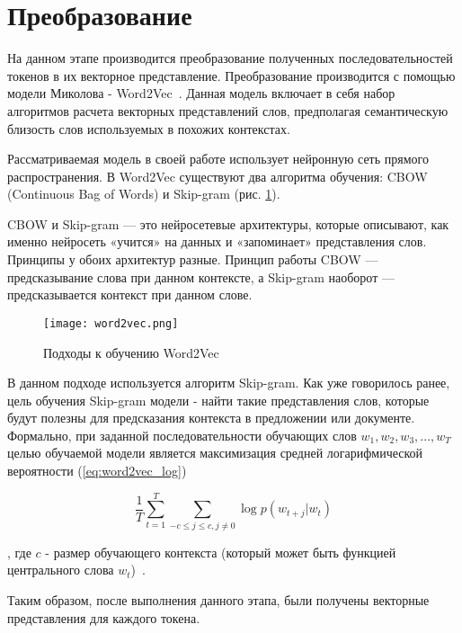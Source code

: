 \section{Преобразование}

На данном этапе производится преобразование полученных последовательностей токенов в их векторное представление. Преобразование производится с помощью модели Миколова - Word2Vec~\cite{word2vec}. Данная модель включает в себя набор алгоритмов расчета векторных представлений слов, предполагая семантическую близость слов используемых в похожих контекстах.

Рассматриваемая модель в своей работе использует нейронную сеть прямого распространения. В Word2Vec существуют два алгоритма обучения: CBOW (Continuous Bag of Words) и Skip-gram (рис. \ref{fig:word2vec}).


CBOW и Skip-gram — это нейросетевые архитектуры, которые описывают, как именно нейросеть «учится» на данных и «запоминает» представления слов. Принципы у обоих архитектур разные. Принцип работы CBOW — предсказывание слова при данном контексте, а Skip-gram наоборот — предсказывается контекст при данном слове.

\begin{figure}[htbp]
\centering
\texttt{[image: word2vec.png]}
\caption{Подходы к обучению Word2Vec}
\label{fig:word2vec}
\end{figure}

В данном подходе используется алгоритм Skip-gram. Как уже говорилось ранее, цель обучения Skip-gram модели - найти такие представления слов, которые будут полезны для предсказания контекста в предложении или документе. Формально, при заданной последовательности обучающих слов \(w_1, w_2, w_3,...,w_T\) целью обучаемой модели является максимизация средней логарифмической вероятности (\ref{eq:word2vec_log})

\begin{equation}
\label{eq:word2vec_log}
\frac{1}{T}\sum_{t=1}^{T}\sum_{-c \leq j \leq c,j\neq0}\log p(w_{t+j}|w_t)
\end{equation}

, где \(c\) - размер обучающего контекста (который может быть функцией центрального слова \(w_t\))~\cite{word2vec}.

Таким образом, после выполнения данного этапа, были получены векторные представления для каждого токена.
